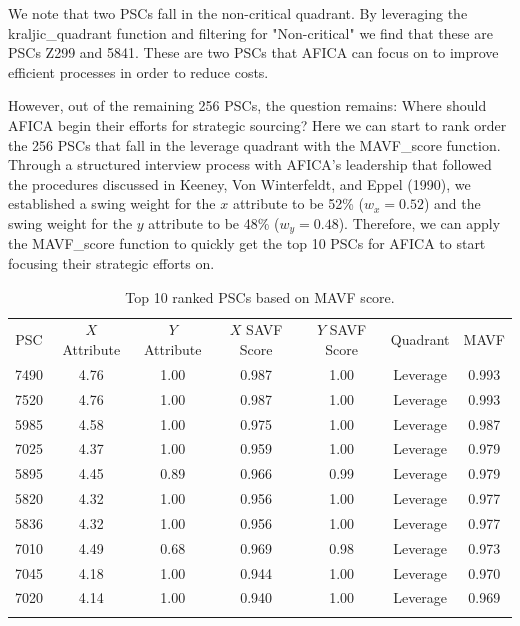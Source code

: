 \documentclass[twocolumn]{svjour3}       %
\begin{document}
We note that two PSCs fall in the non-critical quadrant.  By leveraging the kraljic\_quadrant function and filtering for "Non-critical" we find that these are PSCs Z299 and 5841.  These are two PSCs that AFICA can focus on to improve efficient processes in order to reduce costs.

However, out of the remaining 256 PSCs, the question remains: Where should AFICA begin their efforts for strategic sourcing?  Here we can start to rank order the 256 PSCs that fall in the leverage quadrant with the MAVF\_score function.  Through a structured interview process with AFICA's leadership that followed the procedures discussed in Keeney, Von Winterfeldt, and Eppel (1990), we established a swing weight for the $x$ attribute to be 52\% ($w_x = 0.52$) and the swing weight for the $y$ attribute to be 48\% ($w_y = 0.48$).  Therefore, we can apply the MAVF\_score function to quickly get the top 10 PSCs for AFICA to start focusing their strategic efforts on.  

\begin{table}[!htb]
  \caption{Top 10 ranked PSCs based on MAVF score.}
  \label{tab:2}       %
  \begin{tabular}{ccccccc}
    \hline\noalign{\smallskip}
    PSC &	$X$ Attribute	& $Y$ Attribute	& $X$ SAVF Score & $Y$ SAVF Score	& Quadrant &	MAVF \\
    \noalign{\smallskip}\hline\noalign{\smallskip}
    7490 & 4.76 &	1.00 &	0.987 &	1.00 &	Leverage &	0.993 \\
    7520 & 4.76 &	1.00 &	0.987 &	1.00 &	Leverage &	0.993 \\
    5985 & 4.58 &	1.00 &	0.975 &	1.00 &	Leverage &	0.987 \\
    7025 &	4.37 &	1.00 &	0.959 &	1.00 &	Leverage &	0.979 \\
    5895 &	4.45 &	0.89 &	0.966 &	0.99 &	Leverage &	0.979 \\
    5820 &	4.32 &	1.00 &	0.956 &	1.00 &	Leverage &	0.977 \\
    5836 &	4.32 &	1.00 &	0.956 &	1.00 &	Leverage &	0.977 \\
    7010 &	4.49 &	0.68 &	0.969 &	0.98 &	Leverage &	0.973 \\ 
    7045 &	4.18 &	1.00 &	0.944 &	1.00 &	Leverage &	0.970 \\
    7020 &	4.14 &	1.00 &	0.940 &	1.00 &	Leverage &	0.969 \\
    \noalign{\smallskip}\hline
  \end{tabular}
\end{table}
\end{document}
